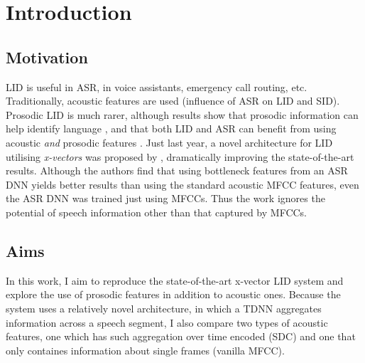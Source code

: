 \documentclass[bsc,frontabs,twoside,singlespacing,parskip,deptreport]{infthesis}
\begin{document}
\chapter{Introduction}{
  \section{Motivation}{
    LID is useful in ASR, in voice assistants, emergency call routing, etc.
    Traditionally, acoustic features are used (influence of ASR on LID and SID). Prosodic LID is much rarer, although results show that prosodic information can help identify language \citep{Lin_et_al_2005}, and that both LID and ASR can benefit from using acoustic \textit{and} prosodic features \citep{Martinez_et_al_2013,Ghahremani_et_al_2014}.
    Just last year, a novel architecture for LID utilising \textit{x-vectors} was proposed by \cite{Snyder_et_al_2018}, dramatically improving the state-of-the-art results. Although the authors find that using bottleneck features from an ASR DNN yields better results than using the standard acoustic MFCC features, even the ASR DNN was trained just using MFCCs. Thus the work ignores the potential of speech information other than that captured by MFCCs.
  }
  \section{Aims}{
    In this work, I aim to reproduce the state-of-the-art x-vector LID system and explore the use of prosodic features in addition to acoustic ones. Because the system uses a relatively novel architecture, in which a TDNN aggregates information across a speech segment, I also compare two types of acoustic features, one which has such aggregation over time encoded (SDC) and one that only containes information about single frames (vanilla MFCC).
  }
}
\end{document}
